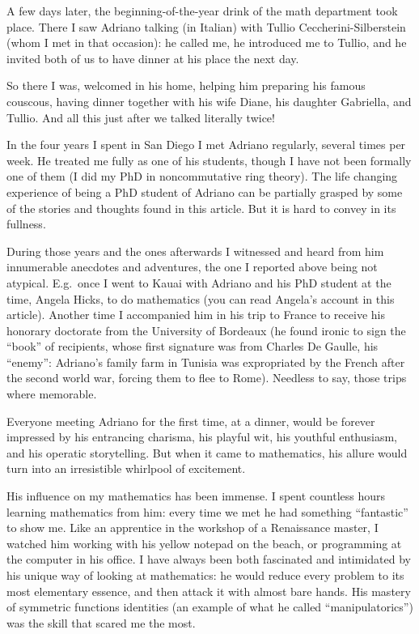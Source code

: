 \documentclass{amsart}
\begin{document}
\smallskip

A few days later, the beginning-of-the-year drink of the math department took place.
There I saw Adriano talking (in Italian) with Tullio Ceccherini-Silberstein (whom I met in that occasion): he called me, he introduced me to Tullio, and he invited both of us to have dinner at his place the next day.

So there I was, welcomed in his home, helping him preparing his famous couscous, having dinner together with his wife Diane, his daughter Gabriella, and Tullio. And all this just after we talked literally twice!

\smallskip

In the four years I spent in San Diego I met Adriano regularly, several times per week. 
He treated me fully as one of his students, though I have not been formally one of them (I did my PhD in noncommutative ring theory). The life changing experience of being a PhD student of Adriano can be partially grasped by some of the stories and thoughts found in this article. But it is hard to convey in its fullness.

During those years and the ones afterwards I witnessed and heard from him innumerable anecdotes and adventures, the one I reported above being not atypical. E.g.\ once I went to Kauai with Adriano and his PhD student at the time, Angela Hicks, to do mathematics (you can read Angela's account in this article). Another time I accompanied him in his trip to France to receive his honorary doctorate from the University of Bordeaux (he found ironic to sign the ``book'' of recipients, whose first signature was from Charles De Gaulle, his ``enemy'': Adriano's family farm in Tunisia was expropriated by the French after the second world war, forcing them to flee to Rome). Needless to say, those trips where memorable.

\smallskip

Everyone meeting Adriano for the first time, at a dinner, would be forever impressed by his entrancing charisma, his playful wit, his youthful enthusiasm, and his operatic storytelling.
But when it came to mathematics, his allure would turn into an irresistible whirlpool of excitement. 


His influence on my mathematics has been immense. I spent countless hours learning mathematics from him: every time we met he had something ``fantastic'' to show me. Like an apprentice in the workshop of a Renaissance master, I watched him working with his yellow notepad on the beach, or programming at the computer in his office. I have always been both fascinated and intimidated by his unique way of looking at mathematics: he would reduce every problem to its most elementary essence, and then attack it with almost bare hands. His mastery of symmetric functions identities (an example of what he called ``manipulatorics'') was the skill that scared me the most. 
\end{document}
